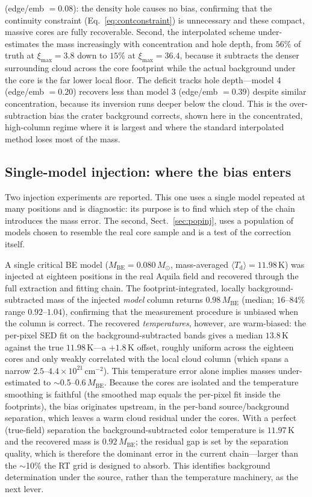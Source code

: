 \documentclass[11pt,a4paper]{article}
\newcommand{\msun}{M_{\odot}}
\newcommand{\ximax}{\xi_{\mathrm{max}}}
\begin{document}
(edge/emb $=0.08$): the density hole causes no bias, confirming that the
continuity constraint (Eq.~\ref{eq:contconstraint}) is unnecessary and these
compact, massive cores are fully recoverable. Second, the interpolated scheme
under-estimates the mass increasingly with concentration and hole depth, from
$56\%$ of truth at $\ximax=3.8$ down to $15\%$ at $\ximax=36.4$, because it
subtracts the denser surrounding cloud across the core footprint while the
actual background under the core is the far lower local floor. The deficit
tracks hole depth---model 4 (edge/emb $=0.20$) recovers less than model 3
(edge/emb $=0.39$) despite similar concentration, because its inversion runs
deeper below the cloud. This is the over-subtraction bias the crater
background corrects, shown here in the concentrated, high-column regime where
it is largest and where the standard interpolated method loses most of the
mass.

\subsection{Single-model injection: where the bias enters}
\label{sec:injtest}

Two injection experiments are reported. This one uses a single model repeated
at many positions and is diagnostic: its purpose is to find which step of the
chain introduces the mass error. The second, Sect.~\ref{sec:popinj}, uses a
population of models chosen to resemble the real core sample and is a test of
the correction itself.

A single critical BE model ($M_{\mathrm{BE}}=0.080\,\msun$, mass-averaged
$\langle T_{\mathrm d}\rangle=11.98$\,K) was injected at eighteen positions
in the real Aquila field and recovered through the full extraction and
fitting chain. The footprint-integrated, locally background-subtracted mass
of the injected \emph{model} column returns $0.98\,M_{\mathrm{BE}}$ (median;
$16$--$84\%$ range $0.92$--$1.04$), confirming that the measurement procedure
is unbiased when the column is correct. The recovered \emph{temperatures},
however, are warm-biased: the per-pixel SED fit on the background-subtracted
bands gives a median $13.8$\,K against the true $11.98$\,K---a $+1.8$\,K
offset, roughly uniform across the eighteen cores and only weakly correlated
with the local cloud column (which spans a narrow $2.5$--$4.4\times10^{21}\,
\mathrm{cm^{-2}}$). This temperature error alone implies masses
under-estimated to $\sim$0.5--0.6\,$M_{\mathrm{BE}}$. Because the cores are
isolated and the temperature smoothing is faithful (the smoothed map equals
the per-pixel fit inside the footprints), the bias originates upstream, in
the per-band source/background separation, which leaves a warm cloud residual
under the cores. With a perfect (true-field) separation the
background-subtracted color temperature is $11.97$\,K and the recovered mass
is $0.92\,M_{\mathrm{BE}}$; the residual gap is set by the separation
quality, which is therefore the dominant error in the current chain---larger
than the $\sim$10\% the RT grid is designed to absorb. This identifies
background determination under the source, rather than the temperature
machinery, as the next lever.
\end{document}
